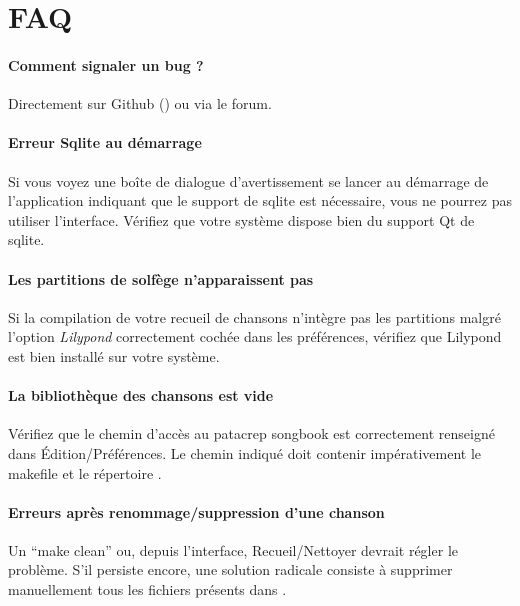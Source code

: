 \todo

\section{FAQ}

\paragraph{Comment signaler un bug ?}
Directement sur Github () ou via le forum.

\paragraph{Erreur Sqlite au démarrage} 
Si vous voyez une boîte de dialogue d'avertissement se lancer au
démarrage de l'application indiquant que le support de sqlite est
nécessaire, vous ne pourrez pas utiliser l'interface. Vérifiez que
votre système dispose bien du support Qt de sqlite.

\paragraph{Les partitions de solfège n'apparaissent pas}
Si la compilation de votre recueil de chansons n'intègre pas les
partitions malgré l'option \emph{Lilypond} correctement cochée dans les
préférences, vérifiez que Lilypond est bien installé sur votre système. 

\paragraph{La bibliothèque des chansons est vide} 
Vérifiez que le chemin d'accès au patacrep songbook est correctement
renseigné dans Édition/Préférences.  Le chemin indiqué doit contenir
impérativement le makefile et le répertoire .

\paragraph{Erreurs après renommage/suppression d'une chanson} 
Un ``make clean'' ou, depuis l'interface, Recueil/Nettoyer devrait
régler le problème. S'il persiste encore, une solution radicale
consiste à supprimer manuellement tous les fichiers  présents
dans .

